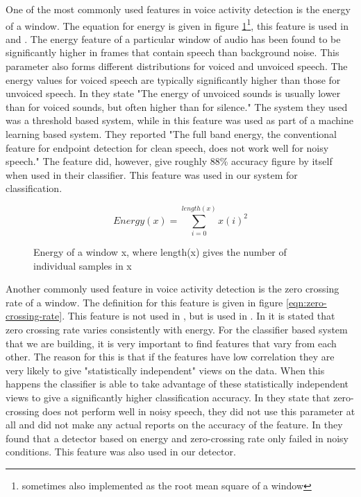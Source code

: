 \documentclass[ %
                    author={Sam Phippen},
                supervisor={Dr. Rafal Bogacz},
                     title={Real time voice activity detectors in noisy personal computing environments},
                  subtitle={},
                    degree={MEng},
                      year={2012} ]{thesis}
\begin{document}
One of the most commonly used features in voice activity detection is the
energy of a window. The equation for energy is given in figure
\ref{eqn:energy}\footnote{ sometimes also implemented as the root mean square
of a window}, this feature is used in
\cite{shin}\cite{sakhnov}\cite{gokhun}\cite{haigh}\cite{atal} and \cite{sohn2}.
The energy feature of a particular window of audio has been found to be
significantly higher in frames that contain speech than background
noise\cite{atal}. This parameter also forms different distributions for voiced
and unvoiced speech. The energy values for voiced speech are typically
significantly higher than those for unvoiced speech. In \cite{atal} they state
"The energy of unvoiced sounds is usually lower than for voiced sounds, but
often higher than for silence." The system they used was a threshold based
system, while in \cite{shin} this feature was used as part of a machine
learning based system.  They reported "The full band energy, the conventional
feature for endpoint detection for clean speech, does not work well for noisy
speech." The feature did, however, give roughly 88\% accuracy figure by itself
when used in their classifier. This feature was used in our system for
classification.

\begin{figure}
    $$Energy(x) = \sum_{i=0}^{length(x)}x(i)^2$$
    \caption{Energy of a window x, where length(x) gives the number of individual
    \label{eqn:energy}
    samples in x}
\end{figure}

Another commonly used feature in voice activity detection is the zero crossing
rate of a window. The definition for this feature is given in figure
\ref{eqn:zero-crossing-rate}. This feature is not used in \cite{shin}, but is
used in \cite{atal}. In \cite{atal} it is stated that zero crossing rate varies
consistently with energy. For the classifier based system that we are building,
it is very important to find features that vary from each other. The reason for
this is that if the features have low correlation they are very likely to give
"statistically independent" views on the data. When this happens the classifier
is able to take advantage of these statistically independent views to give a
significantly higher classification accuracy. In \cite{shin} they state that
zero-crossing does not perform well in noisy speech, they did not use this
parameter at all and did not make any actual reports on the accuracy of the
feature. In \cite{haigh} they found that a detector based on energy and
zero-crossing rate only failed in noisy conditions. This feature was also used
in our detector.
\end{document}
